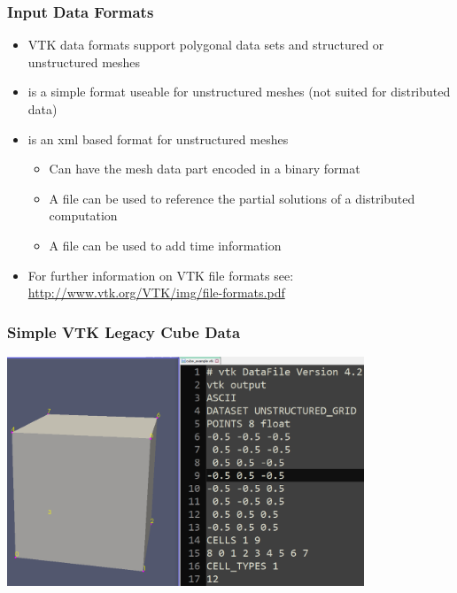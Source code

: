 \begin{frame}

  \frametitle{Input Data Formats}

    \begin{itemize}

      \item VTK data formats support polygonal data sets and structured or unstructured meshes 

      \item {} is a simple format useable for unstructured meshes (not suited for distributed data)  

      \item {} is an xml based format for unstructured meshes   
    \begin{itemize}

      \item Can have the mesh data part encoded in a binary format   

      \item A  file can be used to reference the partial solutions of a distributed computation   

      \item A  file can be used to add time information   

    \end{itemize}

    \item For further information on VTK file formats see:
      \url{http://www.vtk.org/VTK/img/file-formats.pdf}

  \end{itemize}

\end{frame}

\begin{frame}
  \frametitle{Simple VTK Legacy Cube Data}
		\begin{center}
      \includegraphics[width=0.8\textwidth]{screenshots/cube-vtk.png}					
		\end{center}
\end{frame}

